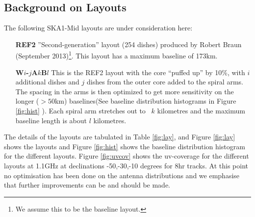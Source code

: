 \documentclass[sfheadings,a4paper,10pt,floats,floatfix]{article}
\begin{document}
\subsection{Background on Layouts}\label{sec:layouts}
The following SKA1-Mid layouts are under consideration here:
\begin{itemize}
\item[{\bf REF2}] ”Second-generation” layout (254 dishes) produced by Robert Braun (September 2013)\footnote{We assume this to
be the baseline layout.}. This layout has a maximum baseline of 173km.
\item[{\bf W$i$-$j$A$k$B$l$}] This is the REF2 layout with the core ``puffed up'' by 10\%, with $i$ additional dishes and $j$
dishes from the outer core added to the spiral arms. The spacing in the arms is then optimized to get more sensitivity on the
longer ($>50$km) baselines(See baseline distribution histograms in Figure \ref{fig:hist} ). Each spiral arm stretches out to ~$k$
kilometres and the maximum baseline length is about $l$ kilometres.
\end{itemize}
The details of the layouts are tabulated in Table \ref{fig:lay}, and Figure \ref{fig:lay} shows the layouts and Figure
\ref{fig:hist} shows the baseline distribution histogram for the different layouts. Figure \ref{fig:uvcov} shows the
uv-coverage for the different layouts at 1.1GHz at declinations
-50,-30,-10 degrees for 8hr tracks. At this point no optimisation has
been done on the antenna distributions and we emphasise that further
improvements can be and should be made.
\end{document}
